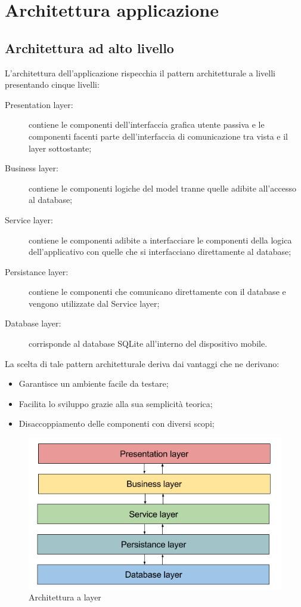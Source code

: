 \documentclass[../DefinizioneDiProdotto.tex,lanscape]{subfiles}
\begin{document}
\section{Architettura applicazione}

	\subsection{Architettura ad alto livello}
		L'architettura dell'applicazione rispecchia il pattern architetturale a livelli presentando cinque livelli:
		\begin{description}
			\item[Presentation layer:] contiene le componenti dell'interfaccia grafica utente passiva e le componenti facenti parte dell'interfaccia di comunicazione tra vista e il layer sottostante;
			\item[Business layer:] contiene le componenti logiche del model tranne quelle adibite all'accesso al database;
			\item[Service layer:] contiene le componenti adibite a interfacciare le componenti della logica dell'applicativo con quelle che si interfacciano direttamente al database;
			\item[Persistance layer:] contiene le componenti che comunicano direttamente con il database e vengono utilizzate dal Service layer; 
			\item[Database layer:] corrisponde al database SQLite all'interno del dispositivo mobile.
		\end{description}
	La scelta di tale pattern architetturale deriva dai vantaggi che ne derivano:
	\begin{itemize}
		\item Garantisce un ambiente facile da testare;
		\item Facilita lo sviluppo grazie alla sua semplicità teorica;
		\item Disaccoppiamento delle componenti con diversi scopi;
	\end{itemize}
	
	\begin{figure} [h]
		\centering
		\includegraphics[scale=0.4]{img/LayeredArchitecture}
		\caption{Architettura a layer}
		\label{fig:LayerArchitecture}
	\end{figure}
	
\end{document}
